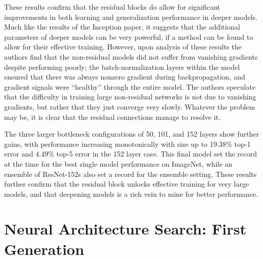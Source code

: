 These results confirm that the residual blocks do allow for significant improvements in both learning and generalization
performance in deeper models. Much like the results of the Inception paper, it suggests that the additional parameters
of deeper models can be very powerful, if a method can be found to allow for their effective training.
However, upon analysis of these results the authors find that the non-residual models did not suffer from vanishing
gradients despite performing poorly; the batch-normalization layers within the model ensured that there was always
nonzero gradient during backpropagation, and gradient signals were ``healthy'' through the entire model. The authors
speculate that the difficulty in training large non-residual networks is not due to vanishing gradients, but rather
that they just converge very slowly. Whatever the problem may be, it is clear that the residual connections manage to
resolve it.

The three larger bottleneck configurations of 50, 101, and 152 layers show further gains, with performance increasing
monotonically with size up to 19.38\% top-1 error and 4.49\% top-5 error in the 152 layer case. This final model set the
record at the time for the best single model performance on ImageNet, while an ensemble of ResNet-152s also set a record
for the ensemble setting. These results further confirm that the residual block unlocks effective training for very
large models, and that deepening models is a rich vein to mine for better performance.


\section{Neural Architecture Search: First Generation}
